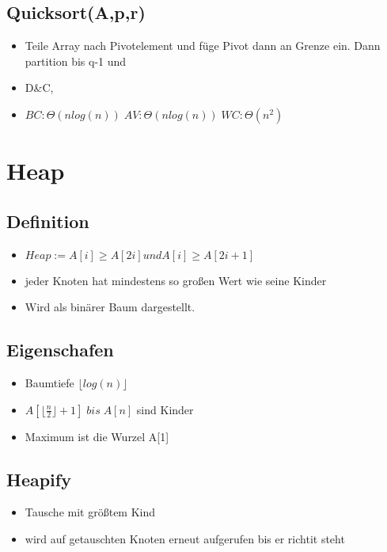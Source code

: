 \documentclass{article}
\begin{document}
\subsection{Quicksort(A,p,r)}
\begin{itemize}
\item Teile Array nach Pivotelement und f{\"u}ge Pivot dann an Grenze ein. Dann partition bis q-1 und 
\item D\&C, 
\item $BC: \Theta(nlog(n))\; AV:\Theta(nlog(n))\; WC: \Theta(n^2)\;$
\end{itemize}

\section{Heap}
\subsection{Definition}

\begin{itemize}
\item $ Heap := A[i] \geq A[2i] und A[i] \geq A[2i+1]$ \\
\item jeder Knoten hat mindestens so gro\ss en Wert wie seine Kinder \\
\item Wird als bin{\"a}rer Baum dargestellt. \newline
\end{itemize}

\subsection{Eigenschafen}
\begin{itemize}
\item Baumtiefe $\lfloor log(n)\rfloor$
\item $A[\lfloor \frac{n}{2} \rfloor +1] \; bis \; A[n]$ sind Kinder
\item Maximum ist die Wurzel A[1]
\end{itemize}
\subsection{Heapify}
\begin{itemize}
\item Tausche mit gr{\"o}\ss tem Kind
\item wird auf getauschten Knoten erneut aufgerufen bis er richtit steht
\end{itemize}
\end{document}
